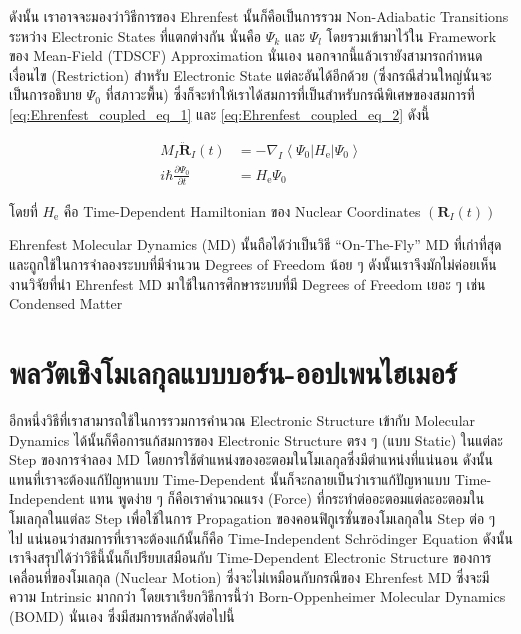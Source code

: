 ดังนั้น เราอาจจะมองว่าวิธีการของ Ehrenfest นั้นก็คือเป็นการรวม Non-Adiabatic Transitions ระหว่าง Electronic States ที่แตกต่างกัน
นั่นคือ $\Psi_k$ และ $\Psi_l$ โดยรวมเข้ามาไว้ใน Framework ของ Mean-Field (TDSCF) Approximation นั่นเอง
นอกจากนี้แล้วเรายังสามารถกำหนดเงื่อนไข (Restriction) สำหรับ Electronic State แต่ละอันได้อีกด้วย (ซึ่งกรณีส่วนใหญ่นั่นจะเป็นการอธิบาย
$\Psi_0$ ที่สภาวะพื้น) ซึ่งก็จะทำให้เราได้สมการที่เป็นสำหรับกรณีพิเศษของสมการที่ \eqref{eq:Ehrenfest_coupled_eq_1} และ
\eqref{eq:Ehrenfest_coupled_eq_2} ดังนี้

\begin{align}
  \label{eq:Ehrenfest_EoQ_1}
  M_I \ddot{\mathbf{R}}_I(t)
   & =
  -\nabla_I\left\langle\Psi_0\left|H_{\mathrm{e}}\right| \Psi_0\right\rangle \\
  \label{eq:Ehrenfest_EoQ_2}
  i \hbar \frac{\partial \Psi_0}{\partial t}
   & = H_{\mathrm{e}} \Psi_0
\end{align}

\noindent โดยที่ $H_{\mathrm{e}}$ คือ Time-Dependent Hamiltonian ของ Nuclear Coordinates
$(\mathbf{R}_I(t))$

Ehrenfest Molecular Dynamics (MD) นั้นถือได้ว่าเป็นวิธี \enquote{On-The-Fly} MD ที่เก่าที่สุดและถูกใช้ในการจำลองระบบที่มีจำนวน
Degrees of Freedom น้อย ๆ ดังนั้นเราจึงมักไม่ค่อยเห็นงานวิจัยที่นำ Ehrenfest MD มาใช้ในการศึกษาระบบที่มี Degrees of Freedom เยอะ ๆ
เช่น Condensed Matter

\section{พลวัตเชิงโมเลกุลแบบบอร์น-ออปเพนไฮเมอร์}

อีกหนึ่งวิธีที่เราสามารถใช้ในการรวมการคำนวณ Electronic Structure เข้ากับ Molecular Dynamics ได้นั้นก็คือการแก้สมการของ Electronic
Structure ตรง ๆ (แบบ Static) ในแต่ละ Step ของการจำลอง MD โดยการใช้ตำแหน่งของอะตอมในโมเลกุลซึ่งมีตำแหน่งที่แน่นอน ดังนั้น
แทนที่เราจะต้องแก้ปัญหาแบบ Time-Dependent นั้นก็จะกลายเป็นว่าเราแก้ปัญหาแบบ Time-Independent แทน พูดง่าย ๆ ก็คือเราคำนวณแรง
(Force) ที่กระทำต่ออะตอมแต่ละอะตอมในโมเลกุลในแต่ละ Step เพื่อใช้ในการ Propagation ของคอนฟิกูเรชั่นของโมเลกุลใน Step ต่อ ๆ ไป
แน่นอนว่าสมการที่เราจะต้องแก้นั้นก็คือ Time-Independent Schr\"{o}dinger Equation ดังนั้นเราจึงสรุปได้ว่าวิธีนี้นั้นก็เปรียบเสมือนกับ
Time-Dependent Electronic Structure ของการเคลื่อนที่ของโมเลกุล (Nuclear Motion) ซึ่งจะไม่เหมือนกับกรณีของ Ehrenfest MD
ซึ่งจะมีความ Intrinsic มากกว่า โดยเราเรียกวิธีการนี้ว่า Born-Oppenheimer Molecular Dynamics (BOMD) นั่นเอง ซึ่งมีสมการหลักดังต่อไปนี้

